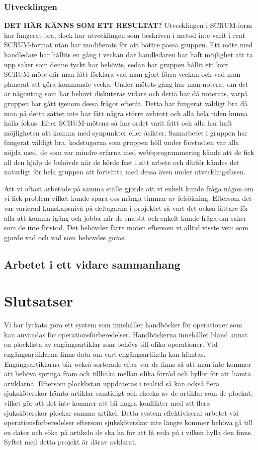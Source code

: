 \documentclass{article}
\begin{document}
\subsubsection{Utvecklingen}
\textbf{DET HÄR KÄNNS SOM ETT RESULTAT?}
Utvecklingen i SCRUM-form har fungerat bra, dock har utvecklingen som beskriven i metod inte varit i rent SCRUM-format utan har modifierats för att bättre passa gruppen. Ett möte med handledare har hållits en gång i veckan där handledaren har haft möjlighet att ta upp saker som denne tyckt har behövts, sedan har gruppen hållit ett kort SCRUM-möte där man fått förklara vad man gjort förra veckan och vad man planerat att göra kommande vecka. Under mötets gång har man noterat om det är någonting som har behövt diskuteras vidare och detta har då noterats, varpå gruppen har gått igenom dessa frågor efteråt. Detta har fungerat väldigt bra då man på detta sättet inte har fått några större avbrott och alla hela tiden kunna hålla fokus. Efter SCRUM-mötena så har ordet varit fritt och alla har haft möjligheten att komma med synpunkter eller åsikter. Samarbetet i gruppen har fungerat väldigt bra, kodstugorna som gruppen höll under förstudien var alla nöjda med, de som var mindre erfarna med webbprogrammering kände att de fick all den hjälp de behövde när de körde fast i sitt arbete och därför kändes det naturligt för hela gruppen att fortsätta med dessa även under utvecklingsfasen.

Att vi oftast arbetade på samma ställe gjorde att vi enkelt kunde fråga någon om vi fick problem vilket kunde spara oss många timmar av felsökning. Eftersom det var varierad kunskapsnivå på deltagarna i projektet så vart det också lättare för alla att komma igång och jobba när de snabbt och enkelt kunde fråga om saker som de inte förstod. Det behövder färre möten eftersom vi alltid visste vem som gjorde vad och vad som behövdes göras.

\subsection{Arbetet i ett vidare sammanhang}

\section{Slutsatser}
Vi har lyckats göra ett system som innehåller handböcker för operationer som kan användas för operationsförberedelser. Handböckerna innehåller bland annat en plocklista av engångsartiklar som behövs till olika operationer. Vid engångsartiklarna finns data om vart engångsartikeln kan hämtas. Engångsartiklarna blir också sorterade efter var de finns så att man inte kommer att behöva springa fram och tillbaka mellan olika förråd och hyllor för att hämta artiklarna. Eftersom plocklistan uppdateras i realtid så kan också flera sjuksköterskor hämta artiklar samtidigt och checka av de artiklar som de plockat, vilket gör att det inte kommer att bli några konflikter med att flera sjuksköterskor plockar samma artikel. Detta system effektiviserar arbetet vid operationsförberedelser eftersom sjuksköterskor inte längre kommer behöva gå till en dator och söka på artikeln de ska ha för att få reda på i vilken hylla den finns. Syftet med detta projekt är därav avklarat.
\end{document}
